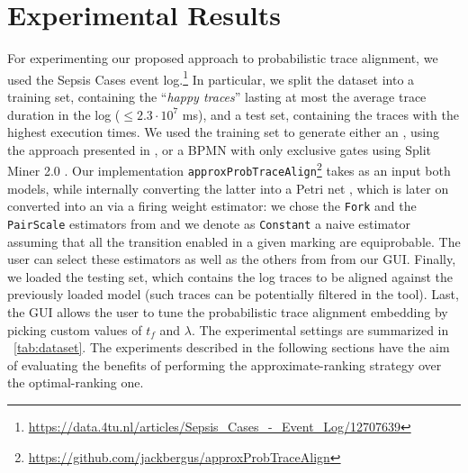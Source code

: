 \section{Experimental Results}\label{sec:exp}
For experimenting our proposed approach to probabilistic trace alignment, we used the Sepsis Cases event log.\footnote{{\small \url{https://data.4tu.nl/articles/Sepsis_Cases_-_Event_Log/12707639}}} In particular, we
split the dataset into a training set, containing the ``\textit{happy traces}''  lasting at most the average trace duration in the log
($\leq 2.3\cdot 10^{7}$ ms), and a test set, containing the traces with the highest execution times. We used the training set to generate either an \uswn, using the approach presented in \cite{RoggeSoltiAW13}, or a BPMN with only exclusive gates using Split Miner 2.0 \cite{AugustoCDRP19}. Our implementation \texttt{approxProbTraceAlign}\footnote{\url{https://github.com/jackbergus/approxProbTraceAlign}} takes as an input both models, while internally converting the latter into a Petri net \cite{PPNFromLog}, which is later on converted into an \uswn via a firing weight estimator: we chose the \texttt{Fork} and the \texttt{PairScale} estimators from \cite{spdwe} and we denote as \texttt{Constant} a naive estimator assuming that all the transition enabled in a given marking are equiprobable. The user can select these estimators as well as the others from \cite{spdwe} from our GUI. 
Finally, we loaded the testing set, which contains the log traces to be aligned against the previously loaded model (such traces can be potentially filtered in the tool). 
Last, the GUI allows the user to tune the probabilistic trace alignment embedding by picking custom values of $t_f$ and $\lambda$.
The experimental settings are summarized in \tablename~\ref{tab:dataset}. The experiments described in the following sections have the aim of evaluating the benefits of performing the approximate-ranking strategy over the optimal-ranking one.

